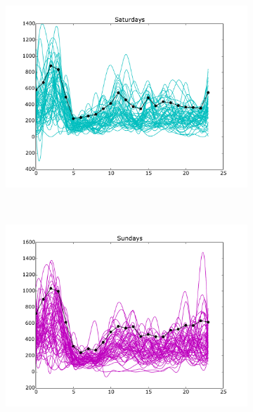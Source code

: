 \documentclass[10pt,a4paper]{amsart}
\begin{document}
\begin{figure}[h!]
    \begin{subfigure}[b]{0.6\textwidth}
        \includegraphics[width=\textwidth]
	        {Figures/Daily_trends_AC_Saturday.pdf}
    \end{subfigure}
    ~
    \begin{subfigure}[b]{0.6\textwidth}
        \includegraphics[width=\textwidth]
       		{Figures/Daily_trends_AC_Sunday.pdf}
    \end{subfigure}
\end{figure}
\end{document}
